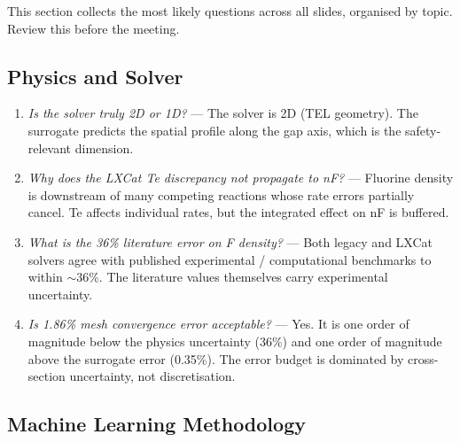 \documentclass[12pt,a4paper]{article}
\begin{document}
This section collects the most likely questions across all slides,
organised by topic. Review this before the meeting.

\subsection*{Physics and Solver}

\begin{enumerate}[1.]
  \item \emph{Is the solver truly 2D or 1D?} ---
    The solver is 2D (TEL geometry). The surrogate predicts the
    spatial profile along the gap axis, which is the
    safety-relevant dimension.

  \item \emph{Why does the LXCat Te discrepancy not propagate to nF?} ---
    Fluorine density is downstream of many competing reactions whose
    rate errors partially cancel. Te affects individual rates, but the
    integrated effect on nF is buffered.

  \item \emph{What is the 36\% literature error on F density?} ---
    Both legacy and LXCat solvers agree with published experimental /
    computational benchmarks to within $\sim$36\%. The literature values
    themselves carry experimental uncertainty.

  \item \emph{Is 1.86\% mesh convergence error acceptable?} ---
    Yes. It is one order of magnitude below the physics uncertainty
    (36\%) and one order of magnitude above the surrogate error
    (0.35\%). The error budget is dominated by cross-section
    uncertainty, not discretisation.
\end{enumerate}

\subsection*{Machine Learning Methodology}
\end{document}
